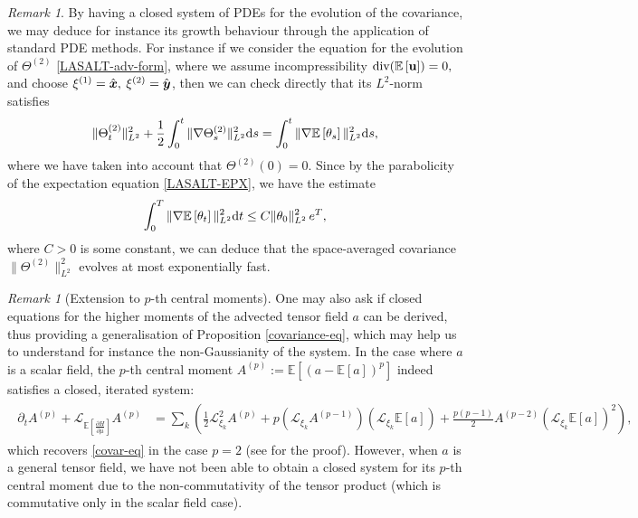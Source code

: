 \documentclass[11pt, oneside]{article}   	%
\numberwithin{equation}{section}
\theoremstyle{plain}
\theoremstyle{definition}
\theoremstyle{remark}
\newtheorem{remark}[theorem]{Remark}
\newcommand{\<}{\langle}
\renewcommand{\>}{\rangle}
\def\diff{\textnormal{d}}
\def\u{{\bf{u}}}
\def\div{{\textrm{div}}}
\newcommand{\mb}[1]{\mbox{\boldmath{$#1$}}}
\newcommand{\E}[1]{\mathbb{E}\left[{#1}\right]}
\begin{document}
\begin{remark}
By having a closed system of PDEs for the evolution of the covariance, we may deduce for instance its growth behaviour through the application of standard PDE methods. For instance if we consider the equation for the evolution of $\Theta^{(2)}$ \eqref{LASALT-adv-form}, where we assume incompressibility $\div{(\E{\u})} = 0,$ and choose $\xi^{(1)} = \hat{\mb{x}},$ $\xi^{(2)}=\hat{\mb{y}}$, then we can check directly that its $L^2$-norm satisfies
\begin{align*}
    \|\Theta^{(2)}_t\|_{L^2}^2 + \frac12 \int^t_0 \|\nabla \Theta^{(2)}_s\|_{L^2}^2 \diff s = \int^t_0 \|\nabla \E{\theta_s}\|_{L^2}^2 \diff s,
\end{align*}
where we have taken into account that $\Theta^{(2)}(0) = 0$. Since by the parabolicity of the expectation equation \eqref{LASALT-EPX}, we have the estimate
\begin{align*}
    \int^T_0 \|\nabla \E{\theta_t}\|_{L^2}^2 \diff t \leq C \|\theta_0\|_{L^2}^2 \, e^T,
\end{align*}
where $C > 0$ is some constant, we can deduce that the space-averaged covariance $\|\Theta^{(2)}\|_{L^2}^2$ evolves at most exponentially fast.
\end{remark}


\begin{remark}[Extension to $p$-th central moments]\label{p-th-moment-remark}
One may also ask if closed equations for the higher moments of the advected tensor field $a$ can be derived, thus providing a generalisation of Proposition \ref{covariance-eq}, which may help us to understand for instance the non-Gaussianity of the system. In the case where $a$ is a scalar field, the $p$-th central moment $A^{(p)} := \E{(a-\E{a})^p}$ indeed satisfies a closed, iterated system:
\begin{align} \label{pth-moment}
    \begin{split}
   \partial_{t} A^{(p)} + \mathcal L_{\E{\frac{\partial H}{\partial \mu}}}A^{(p)} &= \displaystyle\sum_k \left(\frac12 \mathcal L_{\xi_k}^2 A^{(p)} + p\left(\mathcal L_{\xi_k} A^{(p-1)}\right)\left(\mathcal L_{\xi_k} \E{a}\right) + \frac{p(p-1)}{2}A^{(p-2)} \left(\mathcal L_{\xi_k} \E{a}\right)^2\right),
    \end{split}
\end{align}
which recovers \eqref{covar-eq} in the case $p=2$ (see \cite{DieAytJNLS} for the proof). However, when $a$ is a general tensor field, we have not been able to obtain a closed system for its $p$-th central moment due to the non-commutativity of the tensor product (which is commutative only in the scalar field case).
\end{remark}
\end{document}
